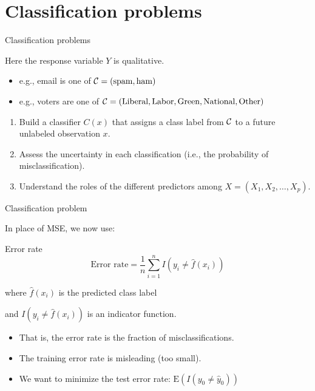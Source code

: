 \documentclass[14pt]{beamer}
\begin{document}
\section{Classification problems}

\begin{frame}{Classification problems}

Here the response variable $Y$ is \alert{qualitative}.
\begin{itemize}
\item e.g., email is one of ${\cal C} = (\text{spam},\text{ham})$
\item e.g., voters are one of ${\cal C} = (\text{Liberal},\text{Labor},\text{Green},\text{National},\text{Other})$
\end{itemize}\pause
{}
\begin{enumerate}
\item Build a classifier $C(x)$ that assigns a class label from ${\cal C}$ to a future unlabeled observation $x$.
\item Assess the uncertainty in each classification (i.e., the probability of misclassification).
\item Understand the roles of the different predictors among $X = (X_1,X_2,\dots,X_p)$.
\end{enumerate}
\end{frame}

\begin{frame}{Classification problem}

In place of MSE, we now use:
\begin{block}{Error rate}
$$
\text{Error rate} = \frac{1}{n}\sum_{i=1}^n I(y_i \ne \hat{f}(x_i))
$$
\end{block}
where $\hat{f}(x_i)$ is the predicted class label

and  $I(y_i\ne \hat{f}(x_i))$ is an indicator function.\pause
\begin{itemize}
\item That is, the error rate is the fraction of misclassifications.
\item The training error rate is misleading (too small).
\item We want to minimize the test error rate:
$
\text{E}(I(y_0 \ne \hat{y}_0))
$
\end{itemize}

\end{frame}
\end{document}
